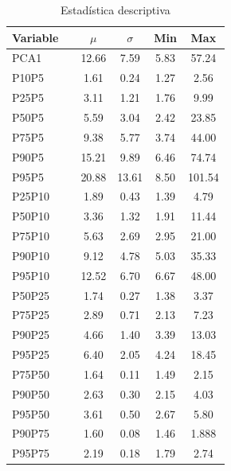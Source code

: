 \documentclass[11pt]{article}
\begin{document}
\begin{table}[H]
\caption{Estadística descriptiva}
\centering\footnotesize
\begin{threeparttable}
\begin{tabular}{@{}lccccc@{}}
\toprule
Variable   &  & $\mu$  & $\sigma$ & Min   & Max     \\ \midrule
PCA1      &  & 12.66  &  7.59            & 5.83  & 57.24    \\
P10P5      &  & 1.61   & 0.24                & 1.27  & 2.56    \\
P25P5      &  & 3.11   & 1.21                & 1.76  & 9.99    \\
P50P5      &  & 5.59   & 3.04                & 2.42  & 23.85   \\
P75P5      &  & 9.38   & 5.77                & 3.74  & 44.00   \\
P90P5      &  & 15.21  & 9.89                & 6.46  & 74.74   \\
P95P5      &  & 20.88  & 13.61               & 8.50  & 101.54  \\
P25P10     &  & 1.89   & 0.43                & 1.39  & 4.79    \\
P50P10     &  & 3.36   & 1.32                & 1.91  & 11.44   \\
P75P10     &  & 5.63   & 2.69                & 2.95  & 21.00   \\
P90P10     &  & 9.12   & 4.78                & 5.03  & 35.33   \\
P95P10     &  & 12.52  & 6.70                & 6.67  & 48.00   \\
P50P25     &  & 1.74   & 0.27                & 1.38  & 3.37    \\
P75P25     &  & 2.89   & 0.71                & 2.13  & 7.23    \\
P90P25     &  & 4.66   & 1.40                & 3.39  & 13.03   \\
P95P25     &  & 6.40   & 2.05                & 4.24  & 18.45   \\
P75P50     &  & 1.64   & 0.11                & 1.49  & 2.15    \\
P90P50     &  & 2.63   & 0.30                & 2.15  & 4.03    \\
P95P50     &  & 3.61   & 0.50                & 2.67  & 5.80    \\
P90P75     &  & 1.60   & 0.08                & 1.46  & 1.888    \\ 
P95P75     &  & 2.19   & 0.18                & 1.79  & 2.74    \\ 

\end{tabular}
\end{threeparttable}
\end{table}
\end{document}
